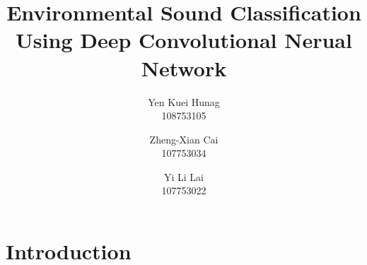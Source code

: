 \documentclass[11pt,oneside,a4paper]{article}
\title{\LARGE \bf
Environmental Sound Classification Using Deep Convolutional Nerual Network
}
\author{Yen Kuei Hunag \\ 108753105 \and  Zheng-Xian Cai \\ 107753034 \and Yi Li Lai \\ 107753022}
\date{\vspace{-5ex}}
\begin{document}
\maketitle

\begin{abstract}
    
\end{abstract}
\section{Introduction}
    
\end{document}
